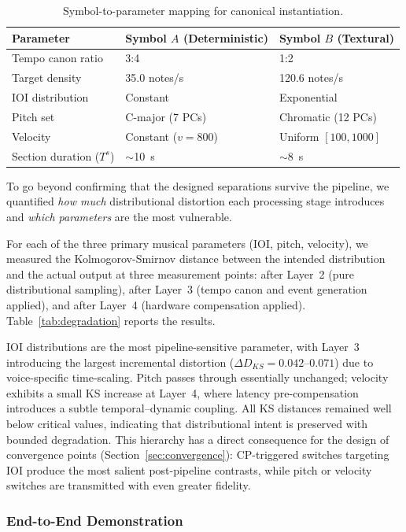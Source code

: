 \documentclass[a4paper]{article}
\newcommand{\tbl}[2]{\caption{#1}\centering#2}
\theoremstyle{definition}
\theoremstyle{remark}
\begin{document}
\begin{table}[htbp]
\tbl{Symbol-to-parameter mapping for canonical instantiation.}
{\begin{tabular}{@{}lll@{}} \toprule
\textbf{Parameter} & \textbf{Symbol $A$ (Deterministic)} & \textbf{Symbol $B$ (Textural)} \\ \midrule
Tempo canon ratio & 3:4 & 1:2 \\
Target density & 35.0 notes/s & 120.6 notes/s \\
IOI distribution & Constant & Exponential \\
Pitch set & C-major (7 PCs) & Chromatic (12 PCs) \\
Velocity & Constant ($v = 800$) & Uniform $[100, 1000]$ \\
Section duration ($T^s$) & $\sim$10~s & $\sim$8~s \\ \bottomrule
\end{tabular}}
\label{tab:symbol_config}
\end{table}

To go beyond confirming that the designed separations survive the pipeline, we quantified \emph{how much} distributional distortion each processing stage introduces and \emph{which parameters} are the most vulnerable.

For each of the three primary musical parameters (IOI, pitch, velocity), we measured the Kolmogorov-Smirnov distance between the intended distribution and the actual output at three measurement points: after Layer~2 (pure distributional sampling), after Layer~3 (tempo canon and event generation applied), and after Layer~4 (hardware compensation applied). Table~\ref{tab:degradation} reports the results.


IOI distributions are the most pipeline-sensitive parameter, with Layer~3 introducing the largest incremental distortion ($\Delta D_{KS} = 0.042$--$0.071$) due to voice-specific time-scaling. Pitch passes through essentially unchanged; velocity exhibits a small KS increase at Layer~4, where latency pre-compensation introduces a subtle temporal--dynamic coupling. All KS distances remained well below critical values, indicating that distributional intent is preserved with bounded degradation. This hierarchy has a direct consequence for the design of convergence points (Section~\ref{sec:convergence}): CP-triggered switches targeting IOI produce the most salient post-pipeline contrasts, while pitch or velocity switches are transmitted with even greater fidelity.

\subsubsection{End-to-End Demonstration}
\end{document}
